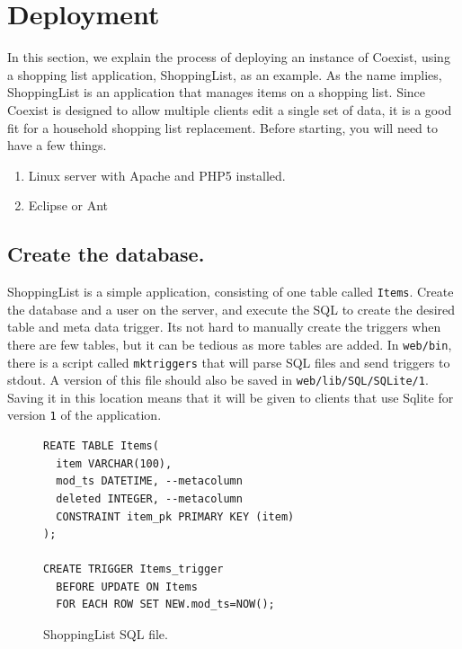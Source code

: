 \documentclass[journal]{IEEEtran}
\begin{document}
\section{Deployment} \label{sec:deployment}



In this section, we explain the process of deploying an instance of Coexist, using a shopping list application, ShoppingList, as an example. As the name implies, ShoppingList is an application that manages items on a shopping list. Since Coexist is designed to allow multiple clients edit a single set of data, it is a good fit for a household shopping list replacement. Before starting, you will need to have a few things.

\begin{enumerate}
\item Linux server with Apache and PHP5 installed. 
\item Eclipse or Ant
\end{enumerate}


\subsection{Create the database.}  \label{sec:}

ShoppingList is a simple application, consisting of one table called \texttt{Items}. Create the database and a user on the server, and execute the SQL to create the desired table and meta data trigger. Its not hard to manually create the triggers when there are few tables, but it can be tedious as more tables are added. In \texttt{web/bin}, there is a script called \texttt{mktriggers} that will parse SQL files and send triggers to stdout. A version of this file should also be saved in \texttt{web/lib/SQL/SQLite/1}. Saving it in this location means that it will be given to clients that use Sqlite for version \texttt{1} of the application.


\begin{figure}[h!]
\begin{lstlisting}
REATE TABLE Items(
  item VARCHAR(100),
  mod_ts DATETIME, --metacolumn
  deleted INTEGER, --metacolumn
  CONSTRAINT item_pk PRIMARY KEY (item)
);

CREATE TRIGGER Items_trigger 
  BEFORE UPDATE ON Items 
  FOR EACH ROW SET NEW.mod_ts=NOW();
\end{lstlisting}
\caption{ShoppingList SQL file.}
\label{fig:shoppinglist_SQL}
\end{figure}
\end{document}
